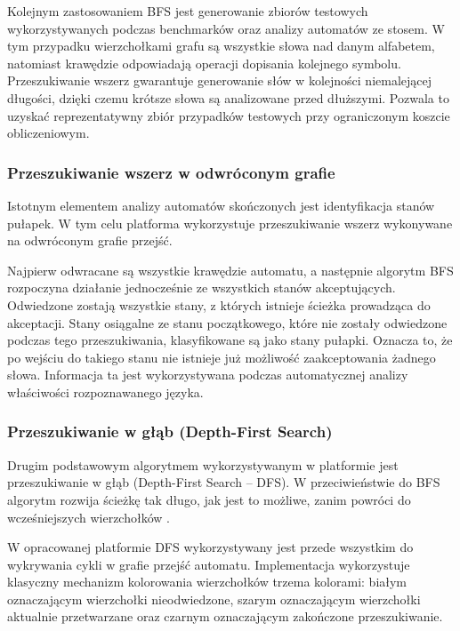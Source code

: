 \documentclass[12pt]{article}
\begin{document}
Kolejnym zastosowaniem BFS jest generowanie zbiorów testowych wykorzystywanych podczas benchmarków oraz analizy automatów ze stosem. W tym przypadku wierzchołkami grafu są wszystkie słowa nad danym alfabetem, natomiast krawędzie odpowiadają operacji dopisania kolejnego symbolu. Przeszukiwanie wszerz gwarantuje generowanie słów w kolejności niemalejącej długości, dzięki czemu krótsze słowa są analizowane przed dłuższymi. Pozwala to uzyskać reprezentatywny zbiór przypadków testowych przy ograniczonym koszcie obliczeniowym.

\subsubsection{Przeszukiwanie wszerz w odwróconym grafie}

Istotnym elementem analizy automatów skończonych jest identyfikacja stanów pułapek. W tym celu platforma wykorzystuje przeszukiwanie wszerz wykonywane na odwróconym grafie przejść.

Najpierw odwracane są wszystkie krawędzie automatu, a następnie algorytm BFS rozpoczyna działanie jednocześnie ze wszystkich stanów akceptujących. Odwiedzone zostają wszystkie stany, z których istnieje ścieżka prowadząca do akceptacji. Stany osiągalne ze stanu początkowego, które nie zostały odwiedzone podczas tego przeszukiwania, klasyfikowane są jako stany pułapki. Oznacza to, że po wejściu do takiego stanu nie istnieje już możliwość zaakceptowania żadnego słowa. Informacja ta jest wykorzystywana podczas automatycznej analizy właściwości rozpoznawanego języka.

\subsubsection{Przeszukiwanie w głąb (Depth-First Search)}

Drugim podstawowym algorytmem wykorzystywanym w platformie jest przeszukiwanie w głąb (Depth-First Search -- DFS). W przeciwieństwie do BFS algorytm rozwija ścieżkę tak długo, jak jest to możliwe, zanim powróci do wcześniejszych wierzchołków \cite{cormen2022}.

W opracowanej platformie DFS wykorzystywany jest przede wszystkim do wykrywania cykli w grafie przejść automatu. Implementacja wykorzystuje klasyczny mechanizm kolorowania wierzchołków trzema kolorami: białym oznaczającym wierzchołki nieodwiedzone, szarym oznaczającym wierzchołki aktualnie przetwarzane oraz czarnym oznaczającym zakończone przeszukiwanie.
\end{document}
